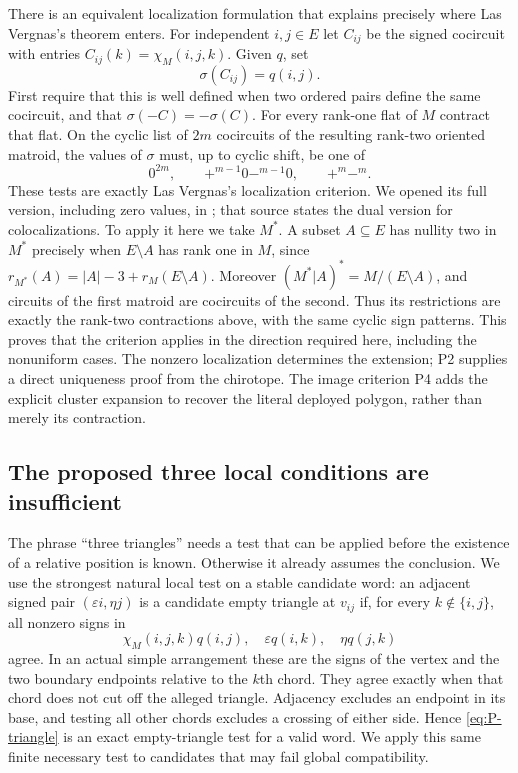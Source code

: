 \documentclass[11pt,a4paper]{article}
\begin{document}
There is an equivalent localization formulation that explains precisely
where Las Vergnas's theorem enters.  For independent $i,j\in E$ let
$C_{ij}$ be the signed cocircuit with entries
$C_{ij}(k)=\chi_M(i,j,k)$.  Given $q$, set
\begin{equation}
               \sigma(C_{ij})=q(i,j).                    \label{eq:P-sigma}
\end{equation}
First require that this is well defined when two ordered pairs define
the same cocircuit, and that $\sigma(-C)=-\sigma(C)$.
For every rank-one flat of $M$ contract that flat.  On the cyclic list
of $2m$ cocircuits of the resulting rank-two oriented matroid, the
values of $\sigma$ must, up to cyclic shift, be one of
\[
 0^{2m},\qquad +^{m-1}0-^{m-1}0,\qquad +^{m}-^{m}.
\]
These tests are exactly Las Vergnas's localization criterion.  We
opened its full version, including zero values, in
\cite[Definition~6.4 and Theorem~6.5, p.~25]{GP2021}; that source states
the dual version for colocalizations.  To apply it here we take $M^*$.
A subset $A\subseteq E$ has nullity two in $M^*$ precisely when
$E\setminus A$ has rank one in $M$, since
$r_{M^*}(A)=|A|-3+r_M(E\setminus A)$.  Moreover
$(M^*|A)^*=M/(E\setminus A)$, and circuits of the first matroid are
cocircuits of the second.  Thus its restrictions are exactly the
rank-two contractions above, with the same cyclic sign patterns.
This proves that the criterion applies in the direction required here,
including the nonuniform cases.  The nonzero localization determines
the extension; P2 supplies a direct uniqueness proof from the
chirotope.  The image criterion P4 adds the explicit cluster expansion
to recover the literal deployed polygon, rather than merely its
contraction.

\subsection{The proposed three local conditions are insufficient}

The phrase ``three triangles'' needs a test that can be applied before
the existence of a relative position is known.  Otherwise it already
assumes the conclusion.  We use the strongest natural local test on a
stable candidate word: an adjacent signed pair
$(\varepsilon i,\eta j)$ is a candidate empty triangle at $v_{ij}$ if,
for every $k\notin\{i,j\}$, all nonzero signs in
\begin{equation}
 \chi_M(i,j,k)q(i,j),\quad \varepsilon q(i,k),\quad
 \eta q(j,k)                                               \label{eq:P-triangle}
\end{equation}
agree.  In an actual simple arrangement these are the signs of the
vertex and the two boundary endpoints relative to the $k$th chord.
They agree exactly when that chord does not cut off the alleged
triangle.  Adjacency excludes an endpoint in its base, and testing all
other chords excludes a crossing of either side.  Hence
\eqref{eq:P-triangle} is an exact empty-triangle test for a valid word.
We apply this same finite necessary test to candidates that may fail
global compatibility.
\end{document}
